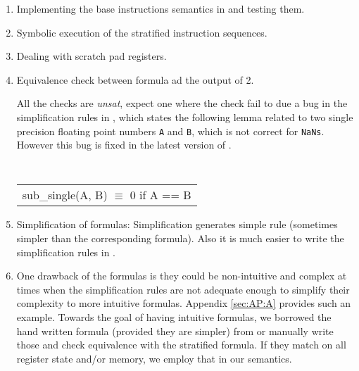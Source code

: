 \begin{enumerate}
\item Implementing the base instructions semantics in \K and testing them.
\item Symbolic execution of the stratified instruction sequences.
\item Dealing with scratch pad registers.
\item Equivalence check between \Strata formula ad the output of 2.
   
   All the checks are \emph{unsat}, expect one where the check fail to due a bug in the simplification
   rules in \Strata, which states the following lemma related to two single precision floating point numbers  {\tt A}  and {\tt B}, which is not correct for {\tt NaNs}. However this bug is fixed in 
   the latest version of \Stoke. 
   
   
   { \tt  
        \begin{tabular}[b]{l}
   \qquad sub\_single(A, B) $\equiv$ 0 if A == B     
      \end{tabular}
  }
   
\item {Simplification of formulas:}
  Simplification generates simple \K rule (sometimes simpler than the corresponding \Strata formula).
 Also it is much easier to write the simplification rules in
  \K.


\item One drawback of the \Strata formulas is they could be non-intuitive and complex at times when the simplification rules are not adequate enough to simplify their complexity to more intuitive formulas. Appendix \ref{sec:AP:A} provides such an example.
Towards the goal of having intuitive formulas, we borrowed the hand written formula (provided they are simpler) from \Stoke or manually write those  and check equivalence with the stratified formula. If they match on all register state and/or memory, we employ that in our \K semantics.


       


\end{enumerate}

